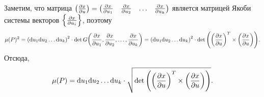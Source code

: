 Заметим, что матрица $\pqty{\pdv{x}{u}} = \begin{pmatrix}
    \pdv{x}{u_{1}} & \pdv{x}{u_{2}} & \ldots & \pdv{x}{u_{k}}
\end{pmatrix}$ является матрицей Якоби системы векторов $\Bqty{\pdv{x}{u_{i}}}$, поэтому
\[
    \mu(P)^{2} = \pqty{\dd u_{1} \dd u_{2} \ldots \dd u_{k}}^{2} \cdot \det G\pqty{\pdv{x}{u_{1}}, \pdv{x}{u_{2}}, \ldots, \pdv{x}{u_{k}}} = \pqty{\dd u_{1} \dd u_{2} \ldots \dd u_{k}}^{2} \cdot \det \pqty{\pqty{\pdv{x}{u}}^{T} \times \pqty{\pdv{x}{u}}}.
\]
Отсюда,
\[
    \mu(P) = \dd u_{1} \dd u_{2} \ldots \dd u_{k} \cdot \sqrt{\det \pqty{\pqty{\pdv{x}{u}}^{T} \times \pqty{\pdv{x}{u}}}}.
\]

